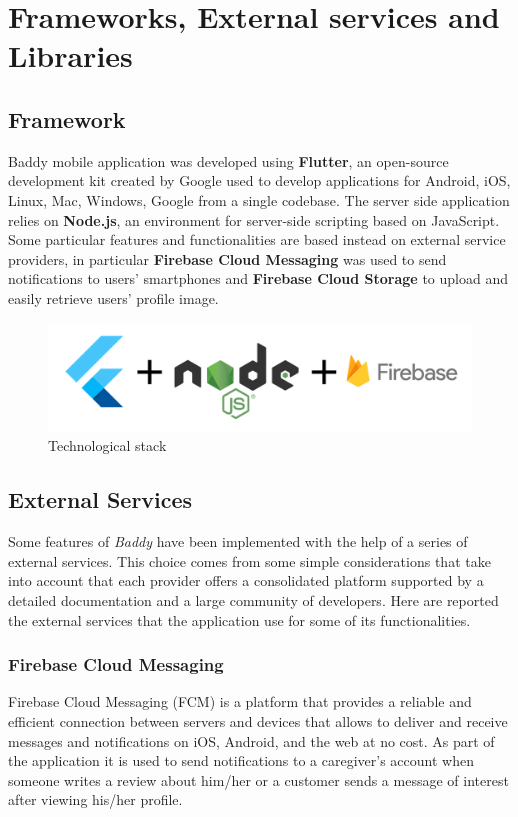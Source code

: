 \documentclass[../../dd.tex]{subfiles}
\begin{document}
\chapter{Frameworks, External services and Libraries}
    \section{Framework}
    Baddy mobile application was developed using \textbf{Flutter}, an open-source development kit created by Google used to develop applications for Android, iOS, Linux, Mac, Windows, Google from a single codebase. The server side application relies on \textbf{Node.js}, an environment for server-side scripting based on JavaScript. Some particular features and functionalities are based instead on external service providers, in particular \textbf{Firebase Cloud Messaging} was used to send notifications to users' smartphones and \textbf{Firebase Cloud Storage} to upload and easily retrieve users' profile image.  
    
    \begin{figure}[H]
        \centering
        \includegraphics[scale=0.6]{../../assets/technology.png}
        \caption{Technological stack}\label{fig:widget-tests}
    \end{figure}
    
    
    \section{External Services}
    Some features of \textit{Baddy} have been implemented with the help of a series of external services. This choice comes from some simple considerations that take into account that each provider offers a consolidated platform supported by a detailed documentation and a large community of developers.
    Here are reported the external services that the application use for some of its functionalities.
    
    \subsection{Firebase Cloud Messaging}
    Firebase Cloud Messaging (FCM) is a platform that provides a reliable and efficient connection between servers and devices that allows to deliver and receive messages and notifications on iOS, Android, and the web at no cost. As part of the application it is used to send notifications to a caregiver's account when someone writes a review about him/her or a customer sends a message of interest after viewing his/her profile.
    
\end{document}
